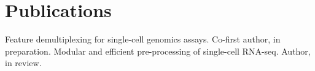 \documentclass[]{resume}
\begin{document}
\begin{minipage}[t]{0.66\textwidth}
\section{Publications}
\renewcommand\refname{\vskip -1.5em} %
\begin{thebibliography}{9}
Feature demultiplexing for single-cell genomics assays. Co-first author, in preparation.
Modular and efficient pre-processing of single-cell RNA-seq. Author, in review.
\end{thebibliography}

\end{minipage}
\end{document}
